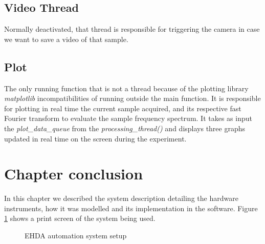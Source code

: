     \subsection{Video Thread}

        Normally deactivated, that thread is responsible for triggering the camera in case we want to save a video of that sample.
    
    \subsection{Plot}

        The only running function that is not a thread because of the plotting library \emph{matplotlib} incompatibilities of running outside the main function. 
        It is responsible for plotting in real time the current sample acquired, and its respective fast Fourier transform to evaluate the sample frequency spectrum.
        It takes as input the \emph{plot\_data\_queue} from the \emph{processing\_thread()} and displays three graphs updated in real time on the screen during the experiment.

  \section{Chapter conclusion}

    In this chapter we described the system description detailing the hardware instruments, how it was modelled and its implementation in the software. 
    Figure \ref{fig:Methodology_example1} shows a print screen of the system being used.

    \begin{figure}[H]
      \centering
      \caption{EHDA automation system setup}
      \label{fig:Methodology_example1}
  \end{figure}
\clearpage
